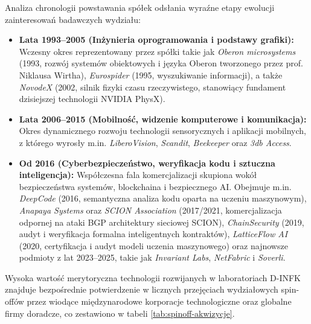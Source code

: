 
Analiza chronologii powstawania spółek odsłania wyraźne etapy ewolucji zainteresowań badawczych wydziału:
\begin{itemize}
    \item \textbf{Lata 1993--2005 (Inżynieria oprogramowania i podstawy grafiki):} Wczesny okres reprezentowany przez spółki takie jak \textit{Oberon microsystems} (1993, rozwój systemów obiektowych i języka Oberon tworzonego przez prof. Niklausa Wirtha), \textit{Eurospider} (1995, wyszukiwanie informacji), a także \textit{NovodeX} (2002, silnik fizyki czasu rzeczywistego, stanowiący fundament dzisiejszej technologii NVIDIA PhysX).
    \item \textbf{Lata 2006--2015 (Mobilność, widzenie komputerowe i komunikacja):} Okres dynamicznego rozwoju technologii sensorycznych i aplikacji mobilnych, z którego wyrosły m.in. \textit{LiberoVision}, \textit{Scandit}, \textit{Beekeeper} oraz \textit{3db Access}.
    \item \textbf{Od 2016 (Cyberbezpieczeństwo, weryfikacja kodu i sztuczna inteligencja):} Współczesna fala komercjalizacji skupiona wokół bezpieczeństwa systemów, blockchaina i bezpiecznego AI. Obejmuje m.in. \textit{DeepCode} (2016, semantyczna analiza kodu oparta na uczeniu maszynowym), \textit{Anapaya Systems} oraz \textit{SCION Association} (2017/2021, komercjalizacja odpornej na ataki BGP architektury sieciowej SCION), \textit{ChainSecurity} (2019, audyt i weryfikacja formalna inteligentnych kontraktów), \textit{LatticeFlow AI} (2020, certyfikacja i audyt modeli uczenia maszynowego) oraz najnowsze podmioty z lat 2023--2025, takie jak \textit{Invariant Labs}, \textit{NetFabric} i \textit{Soverli}.
\end{itemize}


Wysoka wartość merytoryczna technologii rozwijanych w laboratoriach D-INFK znajduje bezpośrednie potwierdzenie w licznych przejęciach wydziałowych spin-offów przez wiodące międzynarodowe korporacje technologiczne oraz globalne firmy doradcze, co zestawiono w tabeli \ref{tab:spinoff-akwizycje}.

